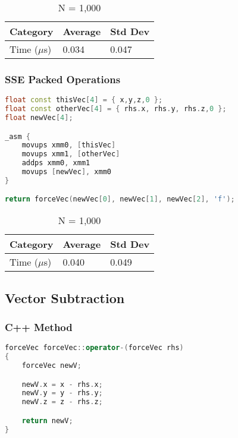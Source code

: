\documentclass{article}
\begin{document}
\vspace{3mm}

\begin{table}[ht!]
\centering
\begin{tabular}{l|l|l}
Category        &   Average &   Std Dev \\
\hline
Time ($\mu$s)    &   0.034   &   0.047   \\
\end{tabular}
\caption{N = 1,000}
\end{table}

\vspace{5mm}

\subsubsection{SSE Packed Operations}

\begin{lstlisting}[language=C++]
float const thisVec[4] = { x,y,z,0 };
float const otherVec[4] = { rhs.x, rhs.y, rhs.z,0 };
float newVec[4];

_asm {
	movups xmm0, [thisVec]
	movups xmm1, [otherVec]
	addps xmm0, xmm1
	movups [newVec], xmm0
}

return forceVec(newVec[0], newVec[1], newVec[2], 'f');
\end{lstlisting}

\vspace{3mm}

\begin{table}[ht!]
\centering
\begin{tabular}{l|l|l}
Category        &   Average &   Std Dev \\
\hline
Time ($\mu$s)    &   0.040   &   0.049   \\
\end{tabular}
\caption{N = 1,000}
\end{table}


\subsection{Vector Subtraction}

\subsubsection{C++ Method}

\begin{lstlisting}[language=C++]
forceVec forceVec::operator-(forceVec rhs)
{
	forceVec newV;

	newV.x = x - rhs.x;
	newV.y = y - rhs.y;
	newV.z = z - rhs.z;

	return newV;
}
\end{lstlisting}
\end{document}

